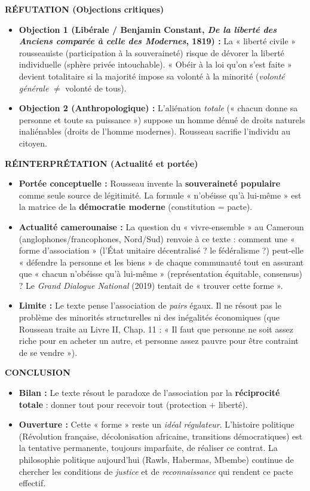 \documentclass[11pt]{article}
\begin{document}
\begin{exoresolu}
\medskip
\noindent\textbf{RÉFUTATION (Objections critiques)}
\begin{itemize}
    \item \textbf{Objection 1 (Libérale / Benjamin Constant, \emph{De la liberté des Anciens comparée à celle des Modernes}, 1819) :} La « liberté civile » rousseauiste (participation à la souveraineté) risque de dévorer la liberté individuelle (sphère privée intouchable). « Obéir à la loi qu'on s'est faite » devient totalitaire si la majorité impose sa volonté à la minorité (\emph{volonté générale} $\neq$ volonté de tous).
    \item \textbf{Objection 2 (Anthropologique) :} L'aliénation \emph{totale} (« chacun donne sa personne et toute sa puissance ») suppose un homme dénué de droits naturels inaliénables (droits de l'homme modernes). Rousseau sacrifie l'individu au citoyen.
\end{itemize}

\medskip
\noindent\textbf{RÉINTERPRÉTATION (Actualité et portée)}
\begin{itemize}
    \item \textbf{Portée conceptuelle :} Rousseau invente la \textbf{souveraineté populaire} comme seule source de légitimité. La formule « n'obéisse qu'à lui-même » est la matrice de la \textbf{démocratie moderne} (constitution = pacte).
    \item \textbf{Actualité camerounaise :} La question du « vivre-ensemble » au Cameroun (anglophones/francophones, Nord/Sud) renvoie à ce texte : comment une « forme d'association » (l'État unitaire décentralisé ? le fédéralisme ?) peut-elle « défendre la personne et les biens » de chaque communauté tout en assurant que « chacun n'obéisse qu'à lui-même » (représentation équitable, consensus) ? Le \emph{Grand Dialogue National} (2019) tentait de « trouver cette forme ».
    \item \textbf{Limite :} Le texte pense l'association de \emph{pairs} égaux. Il ne résout pas le problème des minorités structurelles ni des inégalités économiques (que Rousseau traite au Livre II, Chap. 11 : « Il faut que personne ne soit assez riche pour en acheter un autre, et personne assez pauvre pour être contraint de se vendre »).
\end{itemize}

\medskip
\noindent\textbf{CONCLUSION}
\begin{itemize}
    \item \textbf{Bilan :} Le texte résout le paradoxe de l'association par la \textbf{réciprocité totale} : donner tout pour recevoir tout (protection + liberté).
    \item \textbf{Ouverture :} Cette « forme » reste un \emph{idéal régulateur}. L'histoire politique (Révolution française, décolonisation africaine, transitions démocratiques) est la tentative permanente, toujours imparfaite, de réaliser ce contrat. La philosophie politique aujourd'hui (Rawls, Habermas, Mbembe) continue de chercher les conditions de \emph{justice} et de \emph{reconnaissance} qui rendent ce pacte effectif.
\end{itemize}
\end{exoresolu}
\end{document}
